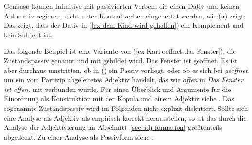 Genauso können Infinitive mit passivierten Verben, die einen Dativ und keinen Akkusativ regieren,
nicht unter Kontrollverben eingebettet werden, wie (a) zeigt:
\eal
{}
\zl
Das zeigt, dass der Dativ in (\ref{ex-dem-Kind-wird-geholfen}) ein Komplement und kein Subjekt ist.
%

Das folgende Beispiel ist eine Variante von (\ref{ex-Karl-oeffnet-das-Fenster}), die Zustandspassiv genannt und mit \sein{} gebildet wird.
\ea 
Das Fenster ist geöffnet.
\z
Es ist aber durchaus umstritten, ob in () ein Passiv vorliegt,
oder ob es sich bei \emph{geöffnet} um ein vom Partizip abgeleitetes Adjektiv handelt, das wie
\emph{offen} in \emph{Das Fenster ist offen.} mit \sein verbunden wurde. Für einen Überblick und Argumente für die
Einordnung als Konstruktion mit der Kopula \sein und einem Adjektiv siehe
. Das sogenannte Zustandspassiv wird im Folgenden nicht explizit
diskutiert. Sollte sich eine Analyse als Adjektiv als empirisch korrekt herausstellen, so ist das
durch die Analyse der Adjektivierung im Abschnitt~\ref{sec-adj-formation} größtenteils abgedeckt. Zu einer
Analyse als Passivform siehe .


